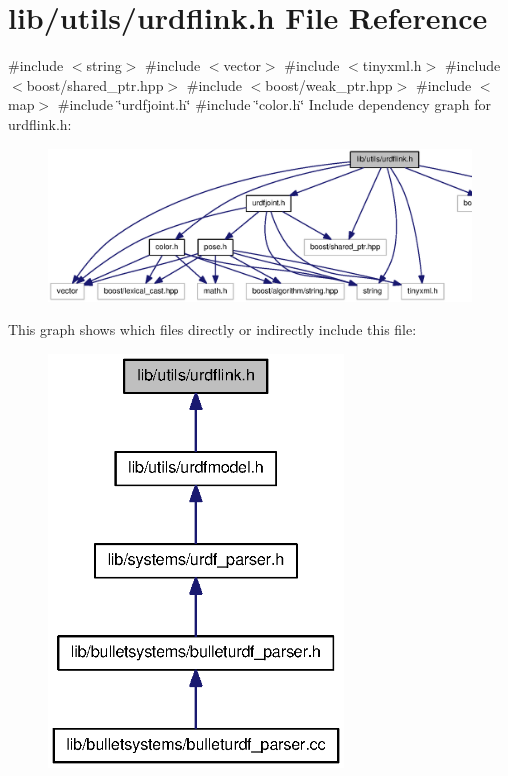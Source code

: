\section{lib/utils/urdflink.h \-File \-Reference}
\label{urdflink_8h}
{\ttfamily \#include $<$string$>$}\*
{\ttfamily \#include $<$vector$>$}\*
{\ttfamily \#include $<$tinyxml.\-h$>$}\*
{\ttfamily \#include $<$boost/shared\-\_\-ptr.\-hpp$>$}\*
{\ttfamily \#include $<$boost/weak\-\_\-ptr.\-hpp$>$}\*
{\ttfamily \#include $<$map$>$}\*
{\ttfamily \#include \char`\"{}urdfjoint.\-h\char`\"{}}\*
{\ttfamily \#include \char`\"{}color.\-h\char`\"{}}\*
\-Include dependency graph for urdflink.\-h\-:\nopagebreak
\begin{figure}[H]
\begin{center}
\leavevmode
\includegraphics[width=350pt]{urdflink_8h__incl}
\end{center}
\end{figure}
\-This graph shows which files directly or indirectly include this file\-:
\nopagebreak
\begin{figure}[H]
\begin{center}
\leavevmode
\includegraphics[width=222pt]{urdflink_8h__dep__incl}
\end{center}
\end{figure}
